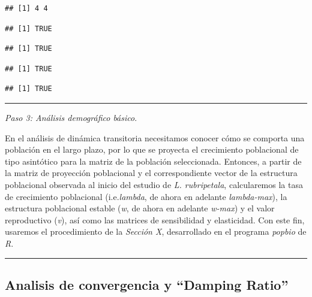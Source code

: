 \documentclass[
]{book}
\theoremstyle{definition}
\theoremstyle{definition}
\theoremstyle{definition}
\theoremstyle{definition}
\theoremstyle{remark}
\begin{document}
\begin{verbatim}
## [1] 4 4
\end{verbatim}

\begin{verbatim}
## [1] TRUE
\end{verbatim}

\begin{verbatim}
## [1] TRUE
\end{verbatim}

\begin{verbatim}
## [1] TRUE
\end{verbatim}

\begin{verbatim}
## [1] TRUE
\end{verbatim}

\begin{center}\rule{0.5\linewidth}{0.5pt}\end{center}

\emph{Paso 3: Análisis demográfico básico}.

En el análisis de dinámica transitoria necesitamos conocer cómo se comporta una población en el largo plazo, por lo que se proyecta el crecimiento poblacional de tipo asintótico para la matriz de la población seleccionada. Entonces, a partir de la matriz de proyección poblacional y el correspondiente vector de la estructura poblacional observada al inicio del estudio de \emph{L. rubripetala}, calcularemos la tasa de crecimiento poblacional (i.e.\emph{lambda}, de ahora en adelante \emph{lambda-max}), la estructura poblacional estable (\emph{w}, de ahora en adelante \emph{w-max}) y el valor reproductivo (\emph{v}), así como las matrices de sensibilidad y elasticidad. Con este fin, usaremos el procedimiento de la \emph{Sección X}, desarrollado en el programa \emph{popbio} de \emph{R}.

\begin{center}\rule{0.5\linewidth}{0.5pt}\end{center}

\subsection{Analisis de convergencia y ``Damping Ratio''}\label{analisis-de-convergencia-y-damping-ratio}
\end{document}
